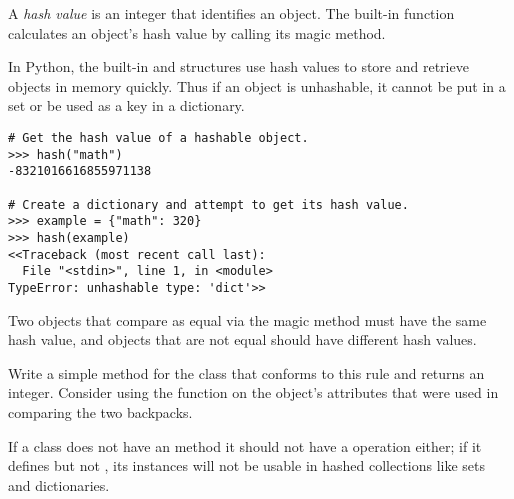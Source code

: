 A \emph{hash value} is an integer that identifies an object.
The built-in  function calculates an object's hash value by calling its  magic method.

In Python, the built-in  and  structures use hash values to store and retrieve objects in memory quickly.
Thus if an object is unhashable, it cannot be put in a set or be used as a key in a dictionary.

\begin{lstlisting}
# Get the hash value of a hashable object.
>>> hash("math")
-8321016616855971138

# Create a dictionary and attempt to get its hash value.
>>> example = {"math": 320}
>>> hash(example)
<<Traceback (most recent call last):
  File "<stdin>", line 1, in <module>
TypeError: unhashable type: 'dict'>>
\end{lstlisting}

\begin{problem} %
Two objects that compare as equal via the  magic method must have the same hash value, and objects that are not equal should have different hash values.

Write a simple  method for the  class that conforms to this rule and returns an integer.
Consider using the  function on the object's attributes that were used in comparing the two backpacks.
\end{problem}

\begin{warn}
If a class does not have an  method it should not have a  operation either; if it defines  but not , its instances will not be usable in hashed collections like sets and dictionaries.
\end{warn}


